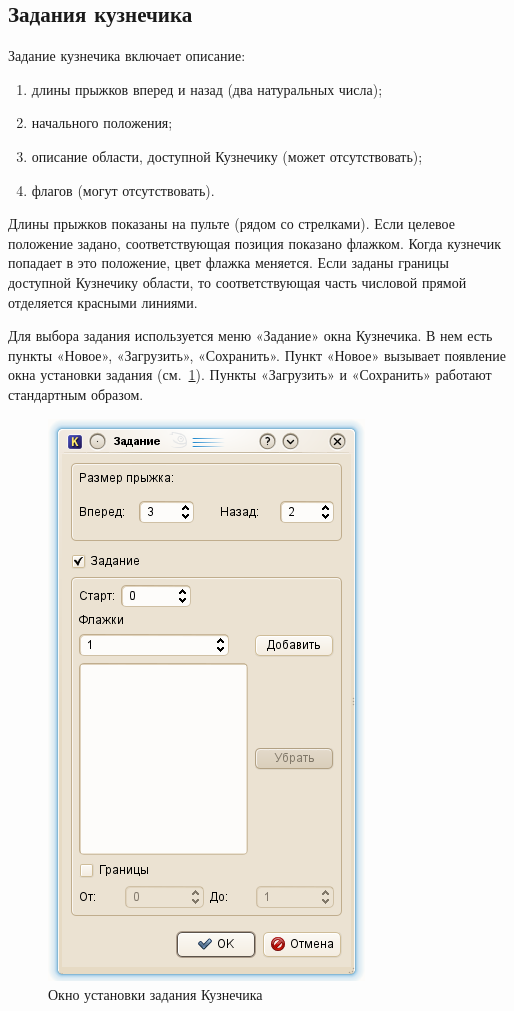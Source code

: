 \subsection{Задания кузнечика}
Задание кузнечика включает описание:
\begin{enumerate}
\item длины прыжков вперед и назад (два натуральных числа);
\item начального положения;
\item описание области, доступной Кузнечику (может отсутствовать);
\item флагов (могут отсутствовать).
\end{enumerate}

Длины прыжков показаны на пульте (рядом со стрелками). Если целевое положение задано, соответствующая позиция показано флажком. Когда кузнечик попадает в  это положение, цвет флажка меняется. Если заданы границы доступной Кузнечику области, то соответствующая часть числовой прямой отделяется красными линиями.

Для выбора задания используется меню «Задание» окна Кузнечика. В нем есть пункты «Новое», «Загрузить», «Сохранить». Пункт «Новое» вызывает появление окна установки задания (см.~\ref{kuznechik-task}). Пункты «Загрузить» и «Сохранить» работают стандартным образом.


\begin{figure}[h]
	\begin{center}
		\includegraphics[scale=0.6]{kuznechik-task.png}
	\end{center}
	\caption{Окно установки задания Кузнечика}
\label{kuznechik-task}
\end{figure}

